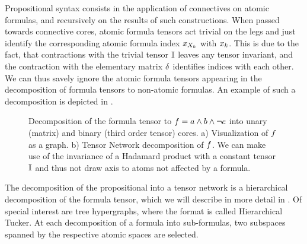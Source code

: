 
Propositional syntax consists in the application of connectives on atomic formulas, and recursively on the results of such constructions.
When passed towards connective cores, atomic formula tensors act trivial on the legs and just identify the corresponding atomic formula index $x_{X_{k}}$ with $x_{k}$.
This is due to the fact, that contractions with the trivial tensor $\mathbb{I}$ leaves any tensor invariant, and the contraction with the elementary matrix $\delta$ identifies indices with each other.
We can thus savely ignore the atomic formula tensors appearing in the decomposition of formula tensors to non-atomic formulas.
An example of such a decomposition is depicted in .

\begin{figure}[h]
\begin{center}
	
\end{center}
\caption{Decomposition of the formula tensor to $f = a \land b \land \lnot c$ into unary (matrix) and binary (third order tensor) cores.
	a) Visualization of $f$ as a graph.
	b) Tensor Network decomposition of $f$.
	We can make use of the invariance of a Hadamard product with a constant tensor $\mathbb{I}$ and thus not draw axis to atoms not affected by a formula.}
\label{fig:decompositionExample}
\end{figure}

\begin{remark}
	The decomposition of the propositional into a tensor network is a hierarchical decomposition of the formula tensor, which we will describe in more detail in .
	Of special interest are tree hypergraphs, where the format is called Hierarchical Tucker.
	At each decomposition of a formula into sub-formulas, two subspaces spanned by the respective atomic spaces are selected. 
\end{remark}


\label{sec:termClauseDecomposition}

